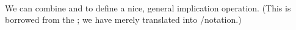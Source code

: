 \begin{code}
\AgdaSymbol{:}\AgdaSpace{}%
\AgdaSymbol{\}\{}\AgdaSpace{}%
\AgdaSymbol{:}\AgdaSpace{}%
\AgdaSpace{}%
\AgdaSpace{}%
\AgdaSymbol{\}}\AgdaSpace{}%
\AgdaSymbol{\{}\AgdaSpace{}%
\AgdaSymbol{:}\AgdaSpace{}%
\AgdaSpace{}%
\AgdaSpace{}%
\AgdaSymbol{\}}\<%
\\
\>[0][@{}l@{\AgdaIndent{0}}]%
\>[1]%
\>[.][@{}l@{}]\<[101I]%
\>[6]\AgdaSpace{}%
\AgdaSpace{}%
\AgdaSpace{}%
\AgdaSpace{}%
\AgdaSpace{}%
\AgdaSpace{}%
\AgdaSpace{}%
\AgdaSpace{}%
\AgdaSpace{}%
\AgdaSpace{}%
\AgdaSpace{}%
\AgdaSpace{}%
\AgdaSpace{}%
\AgdaSpace{}%
\AgdaSpace{}%
\AgdaSpace{}%
\AgdaSpace{}%
\<%
\\
%
\\[\AgdaEmptyExtraSkip]%
\>[0]\AgdaSpace{}%
\AgdaSpace{}%
\AgdaSpace{}%
\AgdaSymbol{=}\AgdaSpace{}%
\AgdaSpace{}%
\AgdaSymbol{\{}\AgdaSpace{}%
\AgdaSymbol{\}}\AgdaSpace{}%
\AgdaSpace{}%
\AgdaSpace{}%
\AgdaSpace{}%
\AgdaSpace{}%
\AgdaSpace{}%
\AgdaSpace{}%
\AgdaSpace{}%
\<%
\end{code}
\ccpad
We can combine  and  to define a nice, general implication operation. (This is borrowed from the \agdastdlib; we have merely translated into \typetopology/\ualib notation.)
\ccpad
